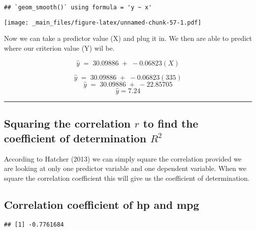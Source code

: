 \documentclass[
]{book}
\newenvironment{Shaded}{\begin{snugshade}}{\end{snugshade}}
\newcommand{\AttributeTok}[1]{\textcolor[rgb]{0.13,0.29,0.53}{#1}}
\newcommand{\FunctionTok}[1]{\textcolor[rgb]{0.13,0.29,0.53}{\textbf{#1}}}
\newcommand{\NormalTok}[1]{#1}
\newcommand{\SpecialCharTok}[1]{\textcolor[rgb]{0.81,0.36,0.00}{\textbf{#1}}}
\theoremstyle{definition}
\theoremstyle{definition}
\theoremstyle{definition}
\theoremstyle{definition}
\theoremstyle{remark}
\begin{document}
\begin{verbatim}
## `geom_smooth()` using formula = 'y ~ x'
\end{verbatim}

\texttt{[image: \_main\_files/figure-latex/unnamed-chunk-57-1.pdf]}

Now we can take a predictor value (X) and plug it in. We then are able to predict where our criterion value (Y) wil be.

\[
\hat{y}\;=\;30.09886\;+\;-0.06823(X)
\]

\[
\hat{y}\;=\;30.09886\;+\;-0.06823(335)
\]
\[
\hat{y}\;=\;30.09886\;+\;-22.85705
\]
\[
\hat{y} = 7.24
\]

\begin{center}\rule{0.5\linewidth}{0.5pt}\end{center}

\hypertarget{squaring-the-correlation-r-to-find-the-coefficient-of-determination-r2}{%
\subsection{\texorpdfstring{Squaring the correlation \({r}\) to find the coefficient of determination \({R^2}\)}{Squaring the correlation \{r\} to find the coefficient of determination \{R\^{}2\}}}\label{squaring-the-correlation-r-to-find-the-coefficient-of-determination-r2}}

According to Hatcher (2013) we can simply square the correlation provided we are looking at only one predictor variable and one dependent variable. When we square the correlation coefficient this will give us the coefficient of determination.

\hypertarget{correlation-coefficient-of-hp-and-mpg}{%
\subsection{Correlation coefficient of hp and mpg}\label{correlation-coefficient-of-hp-and-mpg}}

\begin{Shaded}
\end{Shaded}

\begin{verbatim}
## [1] -0.7761684
\end{verbatim}
\end{document}
